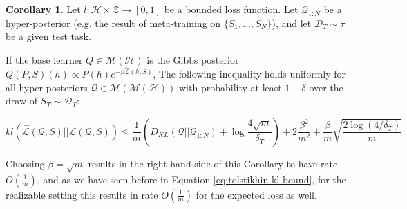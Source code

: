 \documentclass{article}
\theoremstyle{definition}
\newtheorem{corollary}{Corollary}[section]
\newcommand{\Expect}[2]{\mathbb{E}_{#1}\left [#2 \right ]}
\newcommand{\LF}[1]{\textcolor{blue}{\{LF: #1\}}}
\begin{document}
\begin{corollary} \label{thm:kl-main-result}
	Let $l:\mathcal{H}\times \mathcal{Z}\rightarrow [0,1]$ be a bounded loss function.
	Let $\mathcal{Q}_{1:N}$ be a hyper-posterior (e.g. the result of meta-training on $\{S_1,...,S_N\}$), and let $\mathcal{D}_T\sim \tau$ be a given test task. 
	
	If the base learner $Q\in \mathcal{M}(\mathcal{H})$ is the Gibbs posterior $Q(P, S)(h)\propto P(h)e^{-\beta\hat{\mathcal{L}}(h, S)}$, 
	The following inequality holds uniformly for all hyper-posteriors $\mathcal{Q}\in \mathcal{M}(\mathcal{M}(\mathcal{H}))$ with probability at least $1-\delta$ over the draw of $S_T\sim \mathcal{D}_T$:
	
	$$kl(\hat{\mathcal{L}}(\mathcal{Q},S)||\mathcal{L}(\mathcal{Q},S))\leq \frac{1}{m}\left (D_{KL}(\mathcal{Q}||\mathcal{Q}_{1:N})+\log\frac{4\sqrt{m}}{\delta_T} \right ) +2\frac{\beta^2}{m^2}+\frac{\beta}{m}\sqrt{\frac{2\log (4/\delta_T)}{m}} $$
	
\end{corollary}

Choosing $\beta=\sqrt{m}$ results in the right-hand side of this Corollary to have rate $O\left (\frac{1}{m}\right )$, and as we have seen before in Equation \ref{eq:tolstikhin-kl-bound}, for the realizable setting this results in rate $O\left (\frac{1}{m}\right )$ for the expected loss as well.






%
%
%
%
%
%
\end{document}
